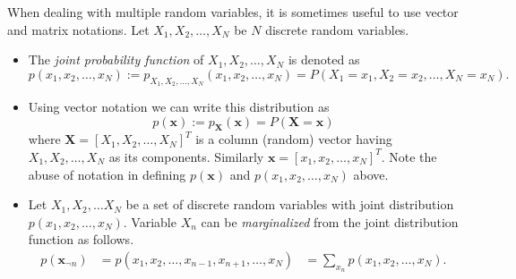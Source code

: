 \documentclass{tufte-handout}
\begin{document}
{When dealing with multiple random variables}, it is sometimes useful to use vector and matrix notations.
Let $X_1,X_2,\dots,X_N$ be $N$ discrete random variables. 
\begin{itemize}
\item The \textit{joint probability function} of  $X_1,X_2,\dots,X_N$ is  denoted as
\begin{equation*}
p(x_1,x_2,\dots,x_N) := p_{X_1,X_2,\dots,X_N}(x_1,x_2,\dots,x_N) =P(X_1=x_1,X_2=x_2,\dots,X_N=x_N).
\end{equation*}
\item Using vector notation we can write this distribution as
\begin{equation*}
p(\mathbf x) := p_{\mathbf X}(\mathbf x) =P(\mathbf X = \mathbf x)
\end{equation*}
where $\mathbf X = [X_1,X_2,\dots,X_N]^T$ is a column (random) vector having $X_1,X_2,\dots,X_N$ as its components.
Similarly $\mathbf x = [x_1,x_2,\dots,x_N]^T$.
Note the abuse of notation in defining $p(\mathbf x)$ and $p(x_1,x_2,\dots,x_N)$ above.
\item   Let $X_1, X_2, \dots X_N$ be a set of discrete random variables with joint distribution $ p(x_1,x_2,\dots,x_N)$.  Variable $X_n$ can be \textit{marginalized} 
from the joint distribution function as follows. 
 \begin{align*}  
 p(\mathbf x_{\neg n}) &= p(x_1,x_2,\dots,x_{n-1},x_{n+1},\dots, x_N) 
                             &= \sum_{x_n} p(x_1,x_2,\dots,x_N).
 \end{align*} 
 

\end{itemize}
\end{document}
